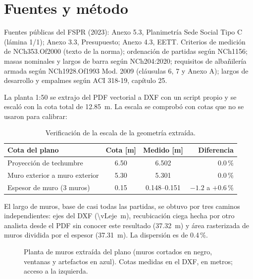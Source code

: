 \documentclass[letterpaper,10pt]{article}
\begin{document}
\section{Fuentes y método}
Fuentes públicas del FSPR (2023): Anexo 5.3, Planimetría Sede Social Tipo C (lámina 1/1); Anexo 3.3, Presupuesto; Anexo 4.3, EETT. Criterios de medición de NCh353.Of2000 (texto de la norma); ordenación de partidas según NCh1156; masas nominales y largos de barra según NCh204:2020; requisitos de albañilería armada según NCh1928.Of1993 Mod. 2009 (cláusulas 6, 7 y Anexo A); largos de desarrollo y empalmes según ACI 318-19, capítulo 25.

\begin{juntos}
La planta 1:50 se extrajo del PDF vectorial a DXF con un script propio y se escaló con la cota total de \SI{12.85}{m}. La escala se comprobó con cotas que no se usaron para calibrar:
\begin{table}
\centering\small
\begin{tabular}{lSSr}
\toprule
Cota del plano & {Cota [m]} & {Medido [m]} & Diferencia\\
\midrule
Proyección de techumbre & 6.50 & 6.502 & 0.0\,\%\\
Muro exterior a muro exterior & 5.30 & 5.301 & 0.0\,\%\\
Espesor de muro (3 muros) & 0.15 & {0.148--0.151} & $-1.2$ a $+0.6$\,\%\\
\bottomrule
\end{tabular}
\caption{Verificación de la escala de la geometría extraída.}
\label{tab:escala}
\end{table}
\end{juntos}

El largo de muros, base de casi todas las partidas, se obtuvo por tres caminos independientes: ejes del DXF (\SI{\vLeje}{m}), recubicación ciega hecha por otro analista desde el PDF sin conocer este resultado (\SI{37.32}{m}) y área rasterizada de muros dividida por el espesor (\SI{37.31}{m}). La dispersión es de 0.4\,\%.

\begin{juntos}
\begin{figure}
\centering
{}
\caption{Planta de muros extraída del plano (muros cortados en negro, ventanas y artefactos en azul). Cotas medidas en el DXF, en metros; acceso a la izquierda.}
\label{fig:planta}
\end{figure}
\end{juntos}
\end{document}
